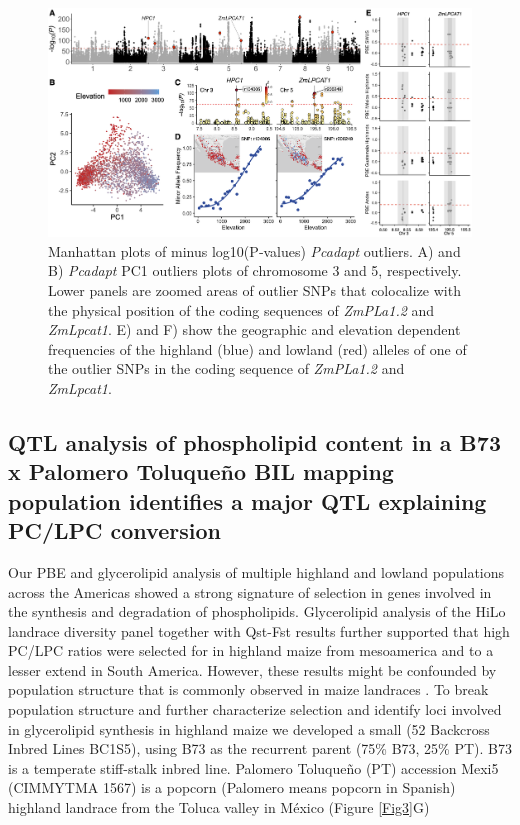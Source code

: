 \documentclass[9pt,twocolumn,twoside,lineno]{gsajnl}
\begin{document}
\begin{figure}[!ht]
\begin{center}
\includegraphics[width=0.4\paperwidth]{Figures/Fig_2.png}
\caption{Manhattan plots of minus log10(P‐values) \textit{Pcadapt} outliers. A) and B) \textit{Pcadapt} PC1 outliers plots of chromosome 3 and 5, respectively. 
Lower panels are zoomed areas of outlier SNPs that colocalize with the physical position of the coding sequences of \textit{ZmPLa1.2} and \textit{ZmLpcat1}. E) and F) show the geographic and elevation dependent frequencies of the highland (blue) and lowland (red) alleles of one of the outlier SNPs in the coding sequence of \textit{ZmPLa1.2} and \textit{ZmLpcat1}.}
\label{Fig2}
\end{center}
\end{figure} 

\subsection{QTL analysis of phospholipid content in a B73 x Palomero Toluqueño BIL mapping population identifies a major QTL explaining PC/LPC conversion} 

Our PBE and glycerolipid analysis of multiple highland and lowland populations across the Americas showed a strong signature of selection in genes involved in the synthesis and degradation of phospholipids. Glycerolipid analysis of the HiLo landrace diversity panel together with Qst-Fst results further supported that high PC/LPC ratios were selected for in highland maize from mesoamerica and to a lesser extend in South America.   
However, these results might be confounded by population structure that is commonly observed in maize landraces \cite{Romero_Navarro2017-cn}. 
To break population structure and further characterize selection and identify loci involved in glycerolipid synthesis in highland maize we developed a small (52 Backcross Inbred  Lines BC1S5), using B73 as the recurrent parent (75\% B73, 25\% PT). 
B73 is a temperate stiff-stalk inbred line. Palomero Toluqueño (PT) accession Mexi5 (CIMMYTMA 1567) is a popcorn (Palomero means popcorn in Spanish) highland landrace from the Toluca valley in México (Figure \ref{Fig3}G) 
\end{document}
